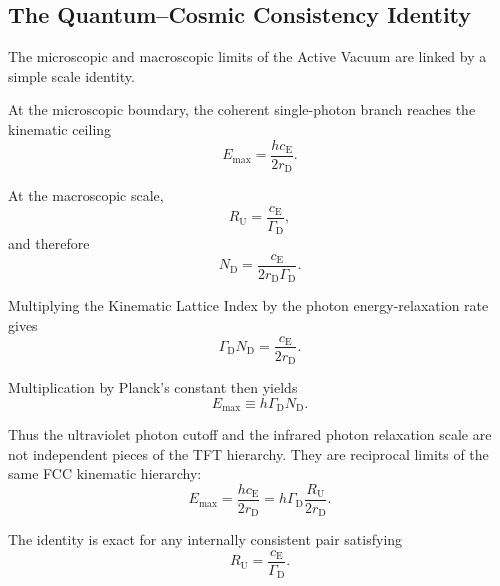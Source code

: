 \subsection{The Quantum--Cosmic Consistency Identity}
\label{sec:quantum_cosmic_identity}

The microscopic and macroscopic limits of the Active Vacuum are linked by a simple scale identity.

At the microscopic boundary, the coherent single-photon branch reaches the kinematic ceiling
\begin{equation}
    E_{\max}
    =
    \frac{
        hc_{\mathrm E}
    }{
        2r_{\mathrm D}
    }.
\end{equation}

At the macroscopic scale,
\begin{equation}
    R_{\mathrm U}
    =
    \frac{
        c_{\mathrm E}
    }{
        \Gamma_{\mathrm D}
    },
\end{equation}
and therefore
\begin{equation}
    N_{\mathrm D}
    =
    \frac{
        c_{\mathrm E}
    }{
        2r_{\mathrm D}\Gamma_{\mathrm D}
    }.
\end{equation}

Multiplying the Kinematic Lattice Index by the photon energy-relaxation rate gives
\begin{equation}
    \Gamma_{\mathrm D}N_{\mathrm D}
    =
    \frac{
        c_{\mathrm E}
    }{
        2r_{\mathrm D}
    }.
\end{equation}

Multiplication by Planck's constant then yields
\begin{equation}
    E_{\max}
    \equiv
    h\Gamma_{\mathrm D}N_{\mathrm D}.
\end{equation}

Thus the ultraviolet photon cutoff and the infrared photon relaxation scale are not independent pieces of the TFT hierarchy. They are reciprocal limits of the same FCC kinematic hierarchy:
\begin{equation}
    E_{\max}
    =
    \frac{
        hc_{\mathrm E}
    }{
        2r_{\mathrm D}
    }
    =
    h\Gamma_{\mathrm D}
    \frac{
        R_{\mathrm U}
    }{
        2r_{\mathrm D}
    }.
\end{equation}

The identity is exact for any internally consistent pair satisfying
\begin{equation}
    R_{\mathrm U}
    =
    \frac{c_{\mathrm E}}
    {\Gamma_{\mathrm D}}.
\end{equation}

